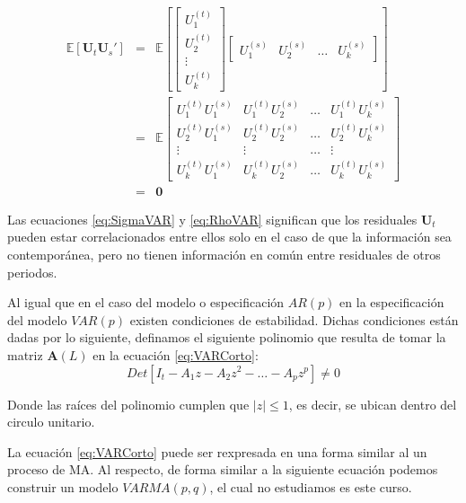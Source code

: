 \documentclass[
]{book}
\begin{document}
\begin{enumerate}
\begin{eqnarray}
      \mathbb{E} [\mathbf{U}_t \mathbf{U}_s'] 
      & = &
      \mathbb{E} \left[
      \begin{bmatrix}
      U^{(t)}_{1} \\ U^{(t)}_{2} \\ \vdots \\ U^{(t)}_{k}
      \end{bmatrix}
      \begin{bmatrix}
      U^{(s)}_{1} & U^{(s)}_{2} & \ldots & U^{(s)}_{k}
      \end{bmatrix}
      \right] \nonumber \\
      & =  & \mathbb{E}
      \begin{bmatrix}
      U^{(t)}_{1} U^{(s)}_{1} & U^{(t)}_{1} U^{(s)}_{2} & \ldots & U^{(t)}_{1} U^{(s)}_{k} \\
      U^{(t)}_{2} U^{(s)}_{1} & U^{(t)}_{2} U^{(s)}_{2} & \ldots & U^{(t)}_{2} U^{(s)}_{k} \\
      \vdots & \vdots & \ldots & \vdots \\
      U^{(t)}_{k} U^{(s)}_{1} & U^{(t)}_{k} U^{(s)}_{2} & \ldots & U^{(t)}_{k} U^{(s)}_{k}
      \end{bmatrix} \nonumber \\
      & = & \mathbf{0}
      \label{eq:RhoVAR}
  \end{eqnarray}
\end{enumerate}

Las ecuaciones \eqref{eq:SigmaVAR} y \eqref{eq:RhoVAR} significan que los residuales \(\mathbf{U}_t\) pueden estar correlacionados entre ellos solo en el caso de que la información sea contemporánea, pero no tienen información en común entre residuales de otros periodos.

Al igual que en el caso del modelo o especificación \(AR(p)\) en la especificación del modelo \(VAR(p)\) existen condiciones de estabilidad. Dichas condiciones están dadas por lo siguiente, definamos el siguiente polinomio que resulta de tomar la matriz \(\mathbf{A}(L)\) en la ecuación \eqref{eq:VARCorto}:
\begin{equation}
    Det[I_t - A_1 z - A_2 z^2 - \ldots - A_p z^p] \neq 0
\end{equation}

Donde las raíces del polinomio cumplen que \(|z| \leq 1\), es decir, se ubican dentro del circulo unitario.

La ecuación \eqref{eq:VARCorto} puede ser rexpresada en una forma similar al un proceso de MA. Al respecto, de forma similar a la siguiente ecuación podemos construir un modelo \(VARMA(p,q)\), el cual no estudiamos es este curso.
\end{document}
